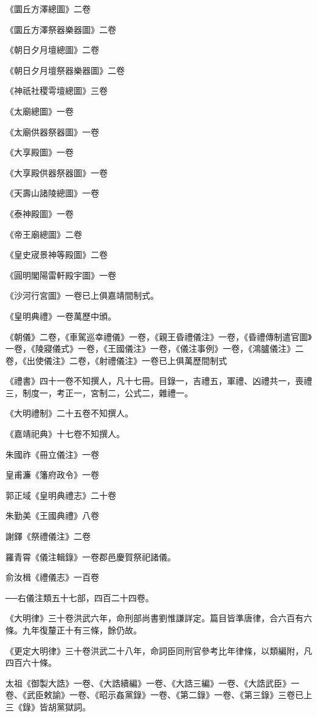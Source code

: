 《圜丘方澤總圖》二卷

《圜丘方澤祭器樂器圖》二卷

《朝日夕月壇總圖》二卷

《朝日夕月壇祭器樂器圖》二卷

《神祇社稷雩壇總圖》三卷

《太廟總圖》一卷

《太廟供器祭器圖》一卷

《大享殿圖》一卷

《大享殿供器祭器圖》一卷

《天壽山諸陵總圖》一卷

《泰神殿圖》一卷

《帝王廟總圖》二卷

《皇史宬景神等殿圖》二卷

《圓明閣陽雷軒殿宇圖》一卷

《沙河行宮圖》一卷已上俱嘉靖間制式。

《皇明典禮》一卷萬歷中頒。

《朝儀》二卷，《車駕巡幸禮儀》一卷，《親王昏禮儀注》一卷，《昏禮傳制遣官圖》一卷，《陵寢儀式》一卷，《王國儀注》一卷，《儀注事例》一卷，《鴻臚儀注》二卷，《出使儀注》二卷，《射禮儀注》一卷已上俱萬歷間制式

《禮書》四十一卷不知撰人，凡十七冊。目錄一，吉禮五，軍禮、凶禮共一，喪禮三，制度一，考正一，宮制二，公式二，雜禮一。

《大明禮制》二十五卷不知撰人。

《嘉靖祀典》十七卷不知撰人。

朱國祚《冊立儀注》一卷

皇甫濂《籓府政令》一卷

郭正域《皇明典禮志》二十卷

朱勤美《王國典禮》八卷

謝鐸《祭禮儀注》二卷

羅青霄《儀注輯錄》一卷郡邑慶賀祭祀諸儀。

俞汝楫《禮儀志》一百卷

──右儀注類五十七部，四百二十四卷。

《大明律》三十卷洪武六年，命刑部尚書劉惟謙詳定。篇目皆準唐律，合六百有六條。九年復釐正十有三條，餘仍故。

《更定大明律》三十卷洪武二十八年，命詞臣同刑官參考比年律條，以類編附，凡四百六十條。

太祖《御製大誥》一卷、《大誥續編》一卷、《大誥三編》一卷、《大誥武臣》一卷、《武臣敕諭》一卷、《昭示姦黨錄》一卷、《第二錄》一卷、《第三錄》三卷已上三《錄》皆胡黨獄詞。


